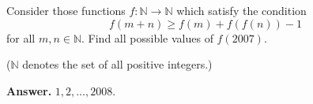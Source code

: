 Consider those functions $f : \mathbb{N} \to \mathbb{N}$ which satisfy the condition
\[
f(m + n) \geq f(m) + f(f(n)) - 1
\]
for all $m, n \in \mathbb{N}$. Find all possible values of $f(2007)$.

($\mathbb{N}$ denotes the set of all positive integers.)

\textbf{Answer.} $1, 2, \ldots, 2008$.
